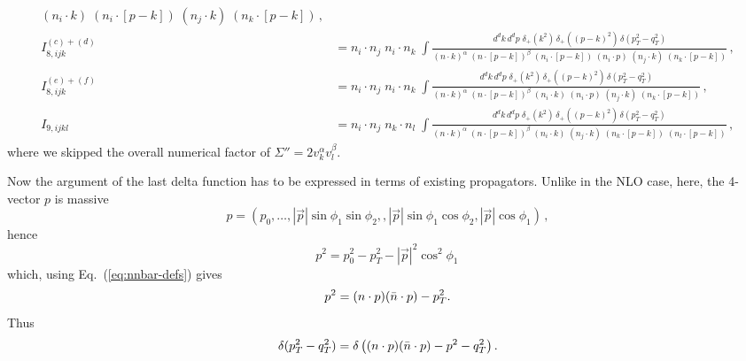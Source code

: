 \documentclass[a4paper,11pt]{report}
\numberwithin{equation}{section}
\begin{document}
\begin{subequations}
\begin{align}
{      (n_i \cdot k) \; (n_i \cdot [p-k]) \; 
      (n_j \cdot k) \; (n_k \cdot [p-k])} \, ,
    \\[0.7em]
    I_{8, ijk}^{(c)+(d)} &= 
    n_i \cdot n_j\; n_i \cdot n_k\; 
    \int 
    \frac{d^d k\, d^d p\;\delta_+(k^2)\, \delta_+((p-k)^2)\,\delta(p_T^2-q_T^2)}
      {(n \cdot k)^\alpha\; (n \cdot [p-k])^\beta \; 
      (n_i \cdot [p-k]) \; (n_i \cdot p) \; 
      (n_j \cdot k) \; (n_k \cdot [p-k])} \, ,
    \\[0.7em]
    I_{8, ijk}^{(e)+(f)} &= 
    n_i \cdot n_j\; n_i \cdot n_k\; 
    \int 
    \frac{d^d k\, d^d p\;\delta_+(k^2)\, \delta_+((p-k)^2)\,\delta(p_T^2-q_T^2)}
      {(n \cdot k)^\alpha\; (n \cdot [p-k])^\beta \; 
      (n_i \cdot k) \; (n_i \cdot p) \; (n_j \cdot k) \; (n_k \cdot [p-k])} \,,
    \\[0.7em]
    I_{9, ijkl} &= 
    n_i \cdot n_j\; n_k \cdot n_l\; 
    \int 
    \frac{d^d k\, d^d p\;\delta_+(k^2)\, \delta_+((p-k)^2)\,\delta(p_T^2-q_T^2)}
      {(n \cdot k)^\alpha\; (n \cdot [p-k])^\beta \; 
      (n_i \cdot k) \; (n_j \cdot k) \; (n_k \cdot [p-k]) \; 
      (n_l \cdot [p-k])} \, ,
  \end{align}
\end{subequations}
%
where we skipped the overall numerical factor of
$\Sigma''= 2 v_k^\alpha v_l^\beta$.

Now the argument of the last delta function has to be expressed in terms of
existing propagators. Unlike in the NLO case, here, the 4-vector $p$ is massive
%
\begin{equation}
 p  = (p_0, \ldots,|\vec p| \sin\phi_1\sin\phi_2, ,|\vec p| \sin\phi_1\cos\phi_2,
                   |\vec p| \cos\phi_1)\,,
\end{equation}
%
hence
%
\begin{equation}
  p^2 =  p_0^2 - p_T^2 - |\vec p|^2 \cos^2\phi_1\,
\end{equation}
%
which, using Eq.~(\ref{eq:nnbar-defs}) gives
%
\begin{equation}
  p^2 = (n\cdot p) (\bar{n} \cdot p) -p_T^2.
\end{equation}
%
Thus
%
\begin{equation}
  \delta(p_T^2 - q_T^2) = \delta\left((n\cdot p) (\bar{n} \cdot p) -p^2 - q_T^2\right).
\end{equation}
\end{document}
